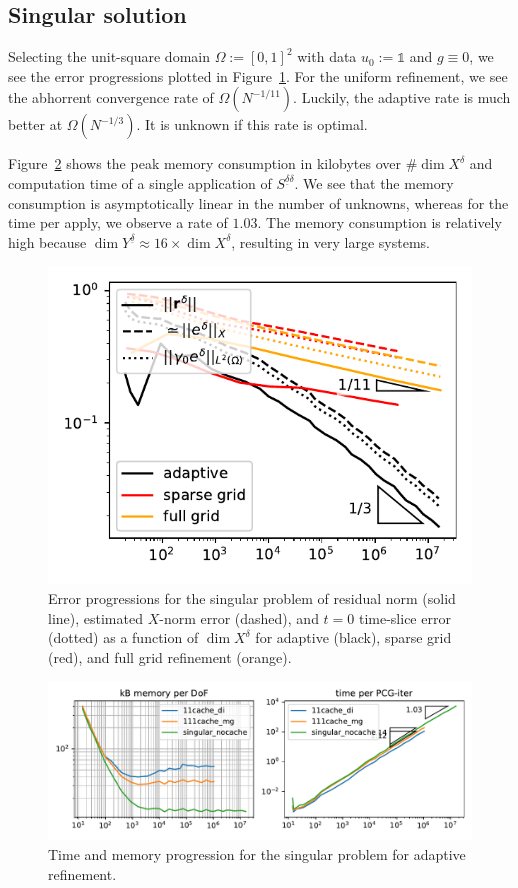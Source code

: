\documentclass[11pt,a4paper,oneside,english]{amsart}
\numberwithin{equation}{section}
\numberwithin{theorem}{section}
\theoremstyle{definition}
\renewcommand{\O}{\Omega}
\newcommand{\udelta}{{\underline{\delta}}}
\newcommand{\jw}[1]{{\color{red}{JW: #1}}}
\newcommand{\bbone}{\mathds{1}}
\begin{document}
\subsection{Singular solution}
Selecting the unit-square domain $\Omega := [0,1]^2$ with data $u_0 := \bbone$
and $g \equiv 0$, we see the error progressions plotted in Figure~\ref{fig:singular-error}.
For the uniform refinement, we see the abhorrent convergence rate of $\O(N^{-1/11})$.
Luckily, the adaptive rate is much better at $\O(N^{-1/3})$. It is unknown
if this rate is optimal.

Figure~\ref{fig:singular-time-memory} shows the peak memory consumption in kilobytes
over $\# \dim X^\delta$ and computation time of a single application of $S^{\udelta \delta}$.
We see that the memory consumption is asymptotically linear in the number of
unknowns, whereas for the time per apply, we observe a rate of $1.03$.\jw{dit is natuurlijk groter dan 1. Is het wel acceptabel?}
The memory consumption is relatively high because $\dim Y^\udelta \approx 16 \times \dim X^\delta$,
resulting in very large systems.\jw{oef, ja wel goed om te vertellen maar 16 is een hoge constante zeg}

\begin{figure}
  \includegraphics[width=0.5\linewidth]{singular_adaptive_errors}
  \caption{Error progressions for the singular problem of residual norm (solid line),
  estimated $X$-norm error (dashed), and $t=0$ time-slice error (dotted) as a function
  of $\dim X^\delta$ for adaptive (black), sparse grid (red), and full grid refinement (orange).}
  \label{fig:singular-error}
\end{figure}
\begin{figure}
  \includegraphics[width=\linewidth]{singular_mem_time.pdf}
  \caption{Time and memory progression for the singular problem for adaptive refinement.\jw{excuse the terrible graph}}
  \label{fig:singular-time-memory}
\end{figure}





\end{document}
